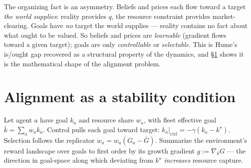 \documentclass[11pt]{article}
\theoremstyle{plain}
\theoremstyle{definition}
\theoremstyle{remark}
\begin{document}
The organizing fact is an asymmetry. Beliefs and prices each flow toward a target \emph{the world supplies}:
reality provides $q$, the resource constraint provides market-clearing. Goals have \emph{no} target the world
supplies --- reality contains no fact about what ought to be valued. So beliefs and prices are \emph{learnable}
(gradient flows toward a given target); goals are only \emph{controllable} or \emph{selectable}. This is Hume's
is/ought gap recovered as a structural property of the dynamics, and \S\ref{sec:alignment} shows it is the
mathematical shape of the alignment problem.

\section{Alignment as a stability condition}\label{sec:alignment}

Let agent $a$ have goal $k_a$ and resource share $w_a$, with fleet effective goal $\bar k=\sum_a w_a k_a$.
Control pulls each goal toward target: $\dot k_a|_{\mathrm{ctrl}}=-\gamma(k_a-k^\star)$. Selection follows the
replicator $\dot w_a=w_a(G_a-\bar G)$. Summarize the environment's reward landscape over goals to first order by
its growth gradient $g:=\nabla_k G$ --- the direction in goal-space along which deviating from $k^\star$
\emph{increases} resource capture.
\end{document}
